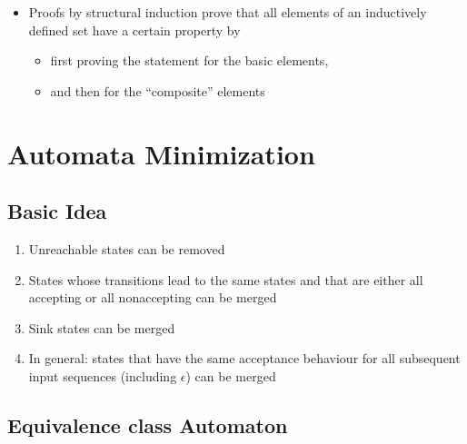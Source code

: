 \documentclass[a3paper, 8pt]{extarticle}
\begin{document}
\begin{multicols*}{6}
\begin{itemize}
    \item Proofs by structural induction prove that all elements of an inductively defined set have a certain property by
    \begin{itemize}
        \item first proving the statement for the basic elements,
        \item and then for the “composite” elements
    \end{itemize}
\end{itemize}






\section{Automata Minimization} 

\subsection{Basic Idea}

\begin{enumerate}
    \item Unreachable states can be removed
    \item States whose transitions lead to the same states and that are either all accepting or all nonaccepting can be merged
    \item Sink states can be merged
    \item In general: states that have the same acceptance behaviour for all subsequent input sequences (including $\epsilon$) can be merged
\end{enumerate}

\subsection{Equivalence class Automaton}


\end{multicols*}
\end{document}
